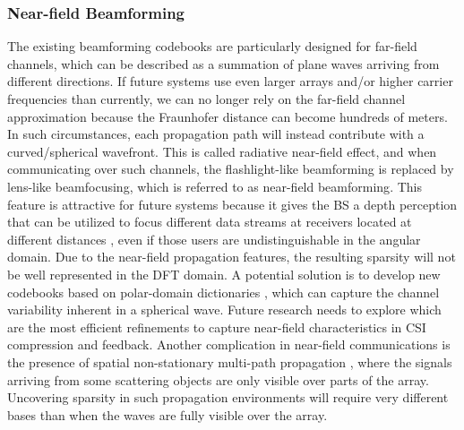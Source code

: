 \documentclass[lettersize,journal]{IEEEtran}
\begin{document}
\subsubsection{Near-field Beamforming}
The existing beamforming codebooks are particularly designed for far-field channels, which can be described as a summation of plane waves arriving from different directions. If future systems use even larger arrays and/or higher carrier frequencies than currently, we can no longer rely on the far-field channel approximation because the Fraunhofer distance can become hundreds of meters. In such circumstances, each propagation path will instead contribute with a curved/spherical wavefront. This is called radiative near-field effect, and when communicating over such channels, the flashlight-like beamforming is replaced by lens-like beamfocusing, which is referred to as near-field beamforming\cite{Kosasih2025a}. This feature is attractive for future systems because it gives the BS a depth perception that can be utilized to focus different data streams at receivers located at different distances \cite{10273772}, even if those users are undistinguishable in the angular domain. Due to the near-field propagation features, the resulting sparsity will not be well represented in the DFT domain. A potential solution is to develop new codebooks based on polar-domain dictionaries \cite{10123941,10403506,9913211,Abdallah2025}, which can capture the channel variability inherent in a spherical wave. Future research needs to explore which are the most efficient refinements to capture near-field characteristics in CSI compression and feedback. Another complication in near-field communications is the presence of spatial non-stationary multi-path propagation \cite{XL2}, where the signals arriving from some scattering objects are only visible over parts of the array. Uncovering sparsity in such propagation environments will require very different bases than when the waves are fully visible over the array.
\end{document}
